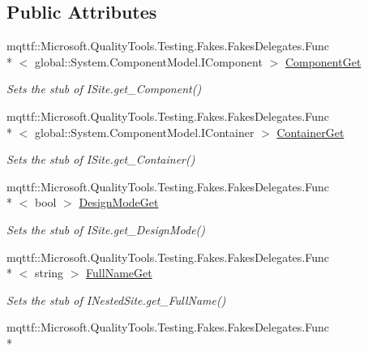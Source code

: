 \subsection*{Public Attributes}
\begin{DoxyCompactItemize}
\item 
mqttf\-::\-Microsoft.\-Quality\-Tools.\-Testing.\-Fakes.\-Fakes\-Delegates.\-Func\\*
$<$ global\-::\-System.\-Component\-Model.\-I\-Component $>$ \hyperlink{class_system_1_1_component_model_1_1_fakes_1_1_stub_i_nested_site_a15cfc4023144c9c76d774ba1bc3f58fa}{Component\-Get}
\begin{DoxyCompactList}\small\item\em Sets the stub of I\-Site.\-get\-\_\-\-Component()\end{DoxyCompactList}\item 
mqttf\-::\-Microsoft.\-Quality\-Tools.\-Testing.\-Fakes.\-Fakes\-Delegates.\-Func\\*
$<$ global\-::\-System.\-Component\-Model.\-I\-Container $>$ \hyperlink{class_system_1_1_component_model_1_1_fakes_1_1_stub_i_nested_site_ad4c329d0a7779a26a210d4db7e3a222f}{Container\-Get}
\begin{DoxyCompactList}\small\item\em Sets the stub of I\-Site.\-get\-\_\-\-Container()\end{DoxyCompactList}\item 
mqttf\-::\-Microsoft.\-Quality\-Tools.\-Testing.\-Fakes.\-Fakes\-Delegates.\-Func\\*
$<$ bool $>$ \hyperlink{class_system_1_1_component_model_1_1_fakes_1_1_stub_i_nested_site_ada6b323e64c354e1a040cdb71ae69a24}{Design\-Mode\-Get}
\begin{DoxyCompactList}\small\item\em Sets the stub of I\-Site.\-get\-\_\-\-Design\-Mode()\end{DoxyCompactList}\item 
mqttf\-::\-Microsoft.\-Quality\-Tools.\-Testing.\-Fakes.\-Fakes\-Delegates.\-Func\\*
$<$ string $>$ \hyperlink{class_system_1_1_component_model_1_1_fakes_1_1_stub_i_nested_site_a30a51d02a91f9207d87b2c3b76bbbc2d}{Full\-Name\-Get}
\begin{DoxyCompactList}\small\item\em Sets the stub of I\-Nested\-Site.\-get\-\_\-\-Full\-Name()\end{DoxyCompactList}\item 
mqttf\-::\-Microsoft.\-Quality\-Tools.\-Testing.\-Fakes.\-Fakes\-Delegates.\-Func\\*

\end{DoxyCompactItemize}
